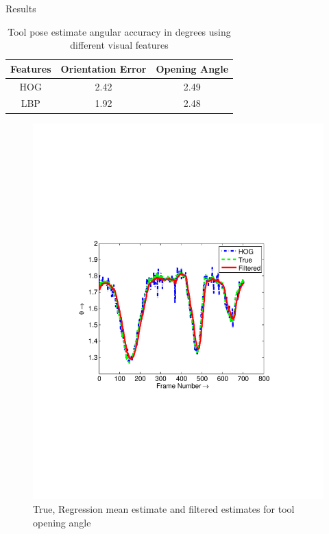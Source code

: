 \begin{frame}{Results}
\begin{table}
\begin{tabular}{| c| c| c| }\hline
 Features &  Orientation Error & Opening Angle \\ \hline
HOG& 2.42  & 2.49\\ \hline
  LBP & 1.92 & 2.48\\ \hline
\end{tabular}
\caption{Tool pose estimate angular accuracy in degrees using different visual features}
\end{table}

\begin{figure}
\centering
\includegraphics[width = 0.5\columnwidth,trim = 20mm 80mm 40mm 80mm,clip]{figures/surgical/kalman_filter}
\caption{True, Regression mean estimate and filtered estimates for tool opening angle} \label{fig:kalman_filter}
\end{figure}

\end{frame}

